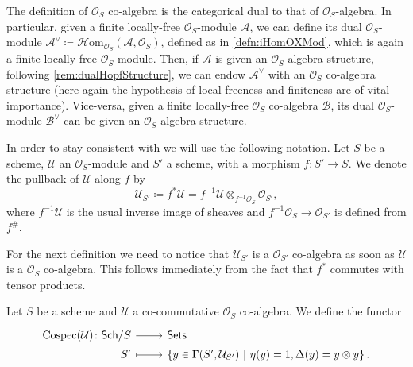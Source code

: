 \begin{rem}\label{rem:(co)algDuality}
	The definition of \(\mathcal{O}_{ S }\) co-algebra is the categorical dual 
	to that of \(\mathcal{O}_{ S }\)-algebra.
	In particular, given a finite locally-free \(\mathcal{O}_{ S }\)-module
	\(\mathcal{A}\), we can define its dual \(\mathcal{O}_{ S }\)-module
	$\mathcal{A}^{\vee} \coloneqq \mathcal{H}\mathrm{om}_{\mathcal{O}_{ S }} 
	\left( \mathcal{A}, \mathcal{O}_{ S } \right)$,
	defined as in \cref{defn:iHomOXMod}, which is again a
	finite locally-free $\mathcal{O}_{ S }$-module.
	Then, if \(\mathcal{A}\) is given an \(\mathcal{O}_{ S }\)-algebra structure,
	following \cref{rem:dualHopfStructure}, we can endow \(\mathcal{A}^\vee\)
	with an \(\mathcal{O}_{ S }\) co-algebra structure
	(here again the hypothesis of local freeness and finiteness are
	of vital importance).
	Vice-versa, given a finite locally-free \(\mathcal{O}_{ S }\) co-algebra
	\(\mathcal{B}\), its dual \(\mathcal{O}_{ S }\)-module \(\mathcal{B}^\vee\)
	can be given an \(\mathcal{O}_{ S }\)-algebra structure.
\end{rem}


\begin{ntt}
	In order to stay consistent with
	\cite{Messing} we will use the following notation.
	Let $S$ be a scheme, $\mathcal{U}$ an $\mathcal{O}_{ S }$-module
	and $S'$ a scheme, with a morphism
	$f\colon S' \to S$.
	We denote the pullback of $\mathcal{U}$ along $f$ by 
	\begin{equation*}
	\mathcal{U}_{S'} \coloneqq f^*\mathcal{U} = 
	f^{-1}\mathcal{U} \otimes_{f^{-1}\mathcal{O}_{ S }} \mathcal{O}_{ S' }
	,\end{equation*}
	where $f^{-1} \mathcal{U}$ is the usual inverse image of sheaves and
	$f^{-1}\mathcal{O}_{ S } \to \mathcal{O}_{ S' }$ is defined from $f^\#$.
\end{ntt}


\noindent
For the next definition we need to notice that
\(\mathcal{U}_{ S' }\) is a \(\mathcal{O}_{ S' }\) co-algebra
as soon as \(\mathcal{U}\) is a \(\mathcal{O}_{ S }\) co-algebra.
This follows immediately from the fact that
\(f^*\) commutes with tensor products.
\begin{defn}
	Let $S$ be a scheme and $\mathcal{U}$ a co-commutative
	$\mathcal{O}_{ S }$ co-algebra.
	We define the functor 
	\begin{equation*}
	\begin{tikzcd}[row sep = 0ex
		,/tikz/column 1/.append style={anchor=base east}
		,/tikz/column 2/.append style={anchor=base west}]
		\cospec(\mathcal{U})\colon 
		\mathsf{Sch}/S\arrow[r, "", rightarrow] &
		\mathsf{Sets} \\
		S' \arrow[r, "", mapsto] & 
		\left\{ y \in \Gamma(S', \mathcal{U}_{S'}) \ \middle|\ 
		\eta(y) = 1, \Delta(y) = y \otimes y\right\}
	.\end{tikzcd}
	\end{equation*} 
\end{defn}


